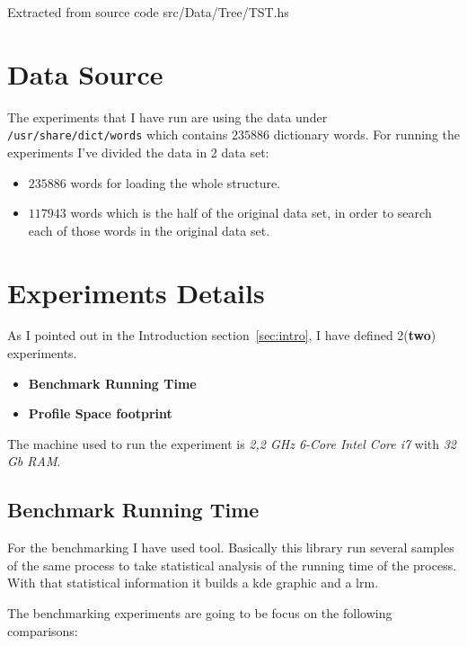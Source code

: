 \documentclass[12pt, a4paper]{article}
\begin{document}
\begin{listing}[H]
  \inputminted[firstline=16, lastline=56, breaklines]{haskell}{../src/Data/Tree/TST.hs}
  \caption{Extracted from source code src/Data/Tree/TST.hs}
  \label{src:tst}
\end{listing}


\section{Data Source}
The experiments that I have run are using the data under \texttt{/usr/share/dict/words} which contains $235886$ dictionary words. For running the experiments I've divided the data in 2 data set:

\begin{itemize}
  \item $235886$ words for loading the whole structure.
  \item $117943$ words which is the half of the original data set, in order to search each of those words in the original data set.
\end{itemize}

\section{Experiments Details}
As I pointed out in the Introduction section~\ref{sec:intro}, I have defined 2(\textbf{two}) experiments.

\begin{itemize}
  \item \textbf{Benchmark Running Time}
  \item \textbf{Profile Space footprint}
\end{itemize}

The machine used to run the experiment is \textit{2,2 GHz 6-Core Intel Core i7} with \textit{32 Gb RAM}.

\subsection{Benchmark Running Time}\label{sub:sec:bench}
For the benchmarking I have used \cite{criterion} tool. Basically this library run several samples of the same process to take statistical analysis of the running time of the process. With that statistical information it builds a \acrfull{kde} graphic and a \acrfull{lrm}.

The benchmarking experiments are going to be focus on the following comparisons:
\end{document}
